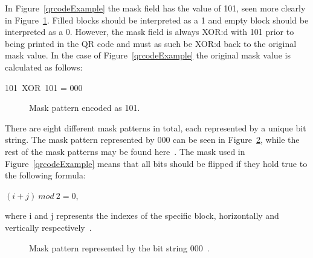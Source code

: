 In Figure~\ref{qrcodeExample} the mask field has the value of 101, seen more clearly in Figure~\ref{qrcodeExampleStep3}. Filled blocks should be interpreted as a 1 and empty block should be interpreted as a 0. However, the mask field is always XOR:d with 101 prior to being printed in the QR code and must as such be XOR:d back to the original mask value. In the case of Figure~\ref{qrcodeExample} the original mask value is calculated as follows:

\begin{center}
	101~XOR~101 = 000
\end{center}

	\begin{figure}[H]%
		\centering
		\caption{Mask pattern encoded as 101.}
		\label{qrcodeExampleStep3}
	\end{figure}

There are eight different mask patterns in total, each represented by a unique bit string. The mask pattern represented by 000 can be seen in Figure~\ref{qrcodemaskpattern}, while the rest of the mask patterns may be found here~\cite{qrcodeMaskPatterns}. The mask used in Figure~\ref{qrcodeExample} means that all bits should be flipped if they hold true to the following formula:

\begin{center}
	\((i+j)~mod~2=0\), 

	where i and j represents the indexes of the specific block, horizontally and vertically respectively~\cite{qrcodeMaskPatterns}.
\end{center}

	\begin{figure}[H]%
		\centering
		\caption{Mask pattern represented by the bit string 000~\cite{qrcodeMaskPatterns}.}
		\label{qrcodemaskpattern}
	\end{figure}
	

